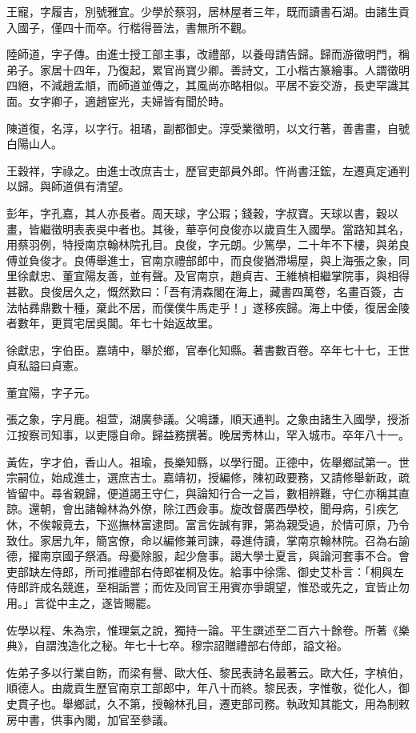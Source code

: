 \begin{pinyinscope}
王寵，字履吉，別號雅宜。少學於蔡羽，居林屋者三年，既而讀書石湖。由諸生貢入國子，僅四十而卒。行楷得晉法，書無所不觀。

陸師道，字子傳。由進士授工部主事，改禮部，以養母請告歸。歸而游徵明門，稱弟子。家居十四年，乃復起，累官尚寶少卿。善詩文，工小楷古篆繪事。人謂徵明四絕，不減趙孟頫，而師道並傳之，其風尚亦略相似。平居不妄交游，長吏罕識其面。女字卿子，適趙宦光，夫婦皆有聞於時。

陳道復，名淳，以字行。祖璚，副都御史。淳受業徵明，以文行著，善書畫，自號白陽山人。

王穀祥，字祿之。由進士改庶吉士，歷官吏部員外郎。忤尚書汪鋐，左遷真定通判以歸。與師道俱有清望。

彭年，字孔嘉，其人亦長者。周天球，字公瑕；錢穀，字叔寶。天球以書，穀以畫，皆繼徵明表表吳中者也。其後，華亭何良俊亦以歲貢生入國學。當路知其名，用蔡羽例，特授南京翰林院孔目。良俊，字元朗。少篤學，二十年不下樓，與弟良傅並負俊才。良傅舉進士，官南京禮部郎中，而良俊猶滯場屋，與上海張之象，同里徐獻忠、董宜陽友善，並有聲。及官南京，趙貞吉、王維楨相繼掌院事，與相得甚歡。良俊居久之，慨然歎曰：「吾有清森閣在海上，藏書四萬卷，名畫百簽，古法帖彞鼎數十種，棄此不居，而僕僕牛馬走乎！」遂移疾歸。海上中倭，復居金陵者數年，更買宅居吳閶。年七十始返故里。

徐獻忠，字伯臣。嘉靖中，舉於鄉，官奉化知縣。著書數百卷。卒年七十七，王世貞私謚曰貞憲。

董宜陽，字子元。

張之象，字月鹿。祖萱，湖廣參議。父鳴謙，順天通判。之象由諸生入國學，授浙江按察司知事，以吏隱自命。歸益務撰著。晚居秀林山，罕入城市。卒年八十一。

黃佐，字才伯，香山人。祖瑜，長樂知縣，以學行聞。正德中，佐舉鄉試第一。世宗嗣位，始成進士，選庶吉士。嘉靖初，授編修，陳初政要務，又請修舉新政，疏皆留中。尋省親歸，便道謁王守仁，與論知行合一之旨，數相辨難，守仁亦稱其直諒。還朝，會出諸翰林為外僚，除江西僉事。旋改督廣西學校，聞母病，引疾乞休，不俟報竟去，下巡撫林富逮問。富言佐誠有罪，第為親受過，於情可原，乃令致仕。家居九年，簡宮僚，命以編修兼司諫，尋進侍讀，掌南京翰林院。召為右諭德，擢南京國子祭酒。母憂除服，起少詹事。謁大學士夏言，與論河套事不合。會吏部缺左侍郎，所司推禮部右侍郎崔桐及佐。給事中徐霈、御史艾朴言：「桐與左侍郎許成名競進，至相詬詈；而佐及同官王用賓亦爭覬望，惟恐或先之，宜皆止勿用。」言從中主之，遂皆賜罷。

佐學以程、朱為宗，惟理氣之說，獨持一論。平生譔述至二百六十餘卷。所著《樂典》，自謂洩造化之秘。年七十七卒。穆宗詔贈禮部右侍郎，謚文裕。

佐弟子多以行業自飭，而梁有譽、歐大任、黎民表詩名最著云。歐大任，字楨伯，順德人。由歲貢生歷官南京工部郎中，年八十而終。黎民表，字惟敬，從化人，御史貫子也。舉鄉試，久不第，授翰林孔目，遷吏部司務。執政知其能文，用為制敕房中書，供事內閣，加官至參議。


\end{pinyinscope}
